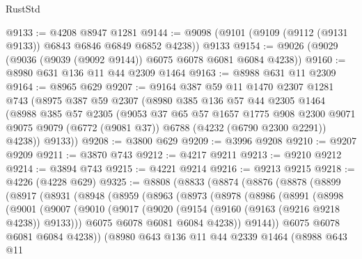 \begin{lexlean}{RustStd}
\begin{coremodule}
@9133 := @4208 @8947 @1281
@9144 := @9098 (@9101 (@9109 (@9112 (@9131 @9133)) @6843 @6846 @6849 @6852 @4238)) @9133
@9154 := @9026 (@9029 (@9036 (@9039 (@9092 @9144)) @6075 @6078 @6081 @6084 @4238))
@9160 := @8980 @631 @136 @11 @44 @2309 @1464
@9163 := @8988 @631 @11 @2309
@9164 := @8965 @629
@9207 := @9164
    @387
    @59
    @11
    @1470
    @2307
    @1281
    @743
    (@8975
      @387
      @59
      @2307
      (@8980
        @385
        @136
        @57
        @44
        @2305
        @1464
        (@8988
          @385
          @57
          @2305
          (@9053
            @37
            @65
            @57
            @1657
            @1775
            @908
            @2300
            @9071
            @9075
            @9079
            (@6772 (@9081 @37))
            @6788
            (@4232 (@6790 @2300 @2291))
            @4238))
        @9133))
@9208 := @3800 @629
@9209 := @3996 @9208
@9210 := @9207 @9209
@9211 := @3870 @743
@9212 := @4217 @9211
@9213 := @9210 @9212
@9214 := @3894 @743
@9215 := @4221 @9214
@9216 := @9213 @9215
@9218 := @4226 (@4228 @629)
@9325 := @8808
    (@8833
      (@8874
        (@8876
          (@8878
            (@8899
              (@8917
                (@8931
                  (@8948
                    (@8959
                      (@8963
                        (@8973
                          (@8978
                            (@8986
                              (@8991
                                (@8998
                                  (@9001
                                    (@9007
                                      (@9010
                                        (@9017
                                          (@9020 (@9154 (@9160 (@9163 (@9216 @9218 @4238)) @9133)))
                                          @6075
                                          @6078
                                          @6081
                                          @6084
                                          @4238))
                                      @9144))
                                  @6075
                                  @6078
                                  @6081
                                  @6084
                                  @4238))
                              (@8980
                                @643
                                @136
                                @11
                                @44
                                @2339
                                @1464
                                (@8988
                                  @643
                                  @11

\end{coremodule}
\end{lexlean}
